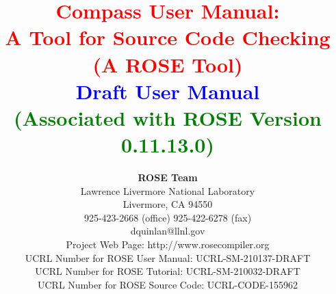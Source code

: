 \documentclass[10pt]{book}
\begin{document}
%
%


\title{ {\bf \textcolor{red}{         Compass User Manual: \\ 
                                A Tool for Source Code Checking \\
                                        (A ROSE Tool)} \\
                               \textcolor{blue}{Draft User Manual} \\
                               \textcolor{green}{(Associated with ROSE Version 0.11.13.0)} } }

\author{ {\bf ROSE Team} \\
         Lawrence Livermore National Laboratory \\ 
         Livermore, CA  94550 \\
         925-423-2668 (office)  925-422-6278 (fax) \\
         {dquinlan}@llnl.gov \\
         Project Web Page: http://www.rosecompiler.org \\
         UCRL Number for ROSE User Manual: UCRL-SM-210137-DRAFT \\
         UCRL Number for ROSE Tutorial: UCRL-SM-210032-DRAFT \\
         UCRL Number for ROSE Source Code: UCRL-CODE-155962 \\ \\
          \\
          \\
       }

\end{document}
